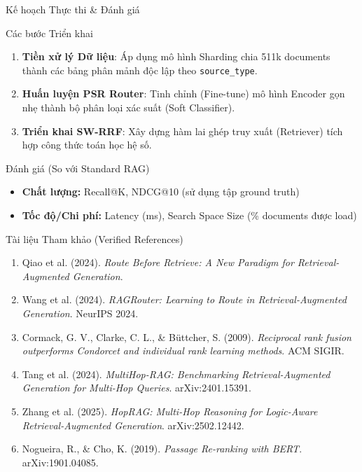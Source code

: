 \documentclass[aspectratio=169,11pt]{beamer}
\begin{document}
\begin{frame}{Kế hoạch Thực thi \& Đánh giá}

\begin{block}{Các bước Triển khai}
\begin{enumerate}
    \item \textbf{Tiền xử lý Dữ liệu}: Áp dụng mô hình Sharding chia 511k documents thành các bảng phân mảnh độc lập theo \texttt{source\_type}.
    \item \textbf{Huấn luyện PSR Router}: Tinh chỉnh (Fine-tune) mô hình Encoder gọn nhẹ thành bộ phân loại xác suất (Soft Classifier).
    \item \textbf{Triển khai SW-RRF}: Xây dựng hàm lai ghép truy xuất (Retriever) tích hợp công thức toán học hệ số.
\end{enumerate}
\end{block}

\vspace{0.3cm}
\begin{block}{Đánh giá (So với Standard RAG)}
\begin{itemize}
    \item \textbf{Chất lượng:} Recall@K, NDCG@10 (sử dụng tập ground truth)
    \item \textbf{Tốc độ/Chi phí:} Latency (ms), Search Space Size (\% documents được load)
\end{itemize}
\end{block}
\end{frame}

\begin{frame}[allowframebreaks]{Tài liệu Tham khảo (Verified References)}
\small
\begin{enumerate}
    \item Qiao et al. (2024). \textit{Route Before Retrieve: A New Paradigm for Retrieval-Augmented Generation}.
    \item Wang et al. (2024). \textit{RAGRouter: Learning to Route in Retrieval-Augmented Generation}. NeurIPS 2024.
    \item Cormack, G. V., Clarke, C. L., \& Büttcher, S. (2009). \textit{Reciprocal rank fusion outperforms Condorcet and individual rank learning methods}. ACM SIGIR.
    \item Tang et al. (2024). \textit{MultiHop-RAG: Benchmarking Retrieval-Augmented Generation for Multi-Hop Queries}. arXiv:2401.15391.
    \item Zhang et al. (2025). \textit{HopRAG: Multi-Hop Reasoning for Logic-Aware Retrieval-Augmented Generation}. arXiv:2502.12442.
    \item Nogueira, R., \& Cho, K. (2019). \textit{Passage Re-ranking with BERT}. arXiv:1901.04085.
\end{enumerate}
\end{frame}
\end{document}
